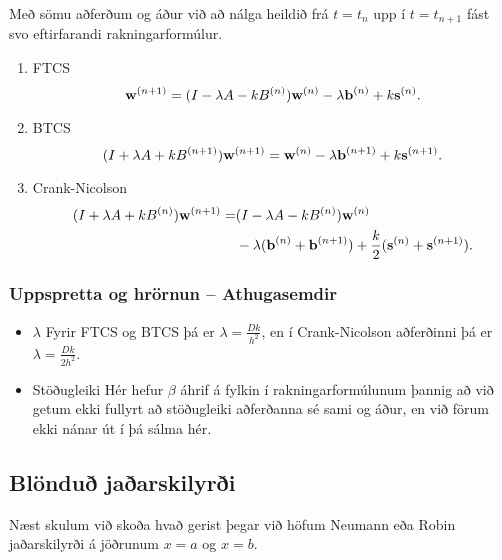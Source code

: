 \documentclass[icelandic,a4paper,12pt]{article}
\begin{document}
Með sömu aðferðum og áður við að nálga heildið frá $t=t_n$ upp í $t=t_{n+1}$
fást svo eftirfarandi rakningarformúlur.\pause
\begin{enumerate}
\item FTCS
   $$
     \mbox{${\bf w}$}^{(n+1)} = (I-\lambda A - kB^{(n)})\mbox{${\bf w}$}^{(n)} 
     - \lambda \mbox{${\bf b}$}^{(n)} + k\mbox{${\bf s}$}^{(n)}.
    $$\pause


\item BTCS
   $$
     (I+\lambda A + kB^{(n+1)})\mbox{${\bf w}$}^{(n+1)} = \mbox{${\bf w}$}^{(n)} 
     - \lambda \mbox{${\bf b}$}^{(n+1)} + k\mbox{${\bf s}$}^{(n+1)}.
    $$\pause


\item Crank-Nicolson
   \begin{align*}
     (I+\lambda A + kB^{(n)})\mbox{${\bf w}$}^{(n+1)}  = &
     (I-\lambda A - kB^{(n)})\mbox{${\bf w}$}^{(n)}\\ 
     & - \lambda (\mbox{${\bf b}$}^{(n)}+\mbox{${\bf b}$}^{(n+1)}) + \frac k2(\mbox{${\bf s}$}^{(n)}+\mbox{${\bf s}$}^{(n+1)}).
    \end{align*}\pause
\end{enumerate}


  \subsubsection{Uppspretta og hrörnun -- Athugasemdir}
\begin{itemize}
  \item $\lambda$
   Fyrir FTCS og BTCS þá er $\lambda = \frac{Dk}{h^2}$, en 
  í Crank-Nicolson aðferðinni þá er $\lambda = \frac{Dk}{2h^2}$.
  
  
  \pause
  
  \item Stöðugleiki
   Hér hefur $\beta$ áhrif á fylkin í rakningarformúlunum þannig að 
   við getum ekki fullyrt að stöðugleiki aðferðanna sé sami
   og áður, en við förum ekki nánar út í þá sálma hér.
\end{itemize}  
  

  
  \subsection{Blönduð jaðarskilyrði}
   Næst skulum við skoða hvað gerist þegar við höfum Neumann eða
   Robin jaðarskilyrði á jöðrunum $x=a$ og $x=b$.
   \pause
   \medskip
   
\end{document}
